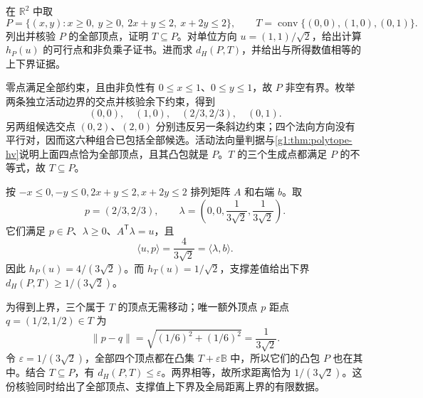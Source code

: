 \begin{exercise}\label{g1:ex:planar-polytope-distance-certificate}
	在 \(\mathbb R^2\) 中取
	\[
		P=\{(x,y):x\ge0,\ y\ge0,\ 2x+y\le2,\ x+2y\le2\},
		\qquad T=\operatorname{conv}\{(0,0),(1,0),(0,1)\}.
	\]
	列出并核验 \(P\) 的全部顶点，证明 \(T\subseteq P\)。对单位方向 \(u=(1,1)/\sqrt2\)，给出计算 \(h_P(u)\) 的可行点和非负乘子证书。进而求 \(d_H(P,T)\)，并给出与所得数值相等的上下界证据。
\end{exercise}
\begin{solution}
	零点满足全部约束，且由非负性有 \(0\le x\le1\)、\(0\le y\le1\)，故 \(P\) 非空有界。枚举两条独立活动边界的交点并核验余下约束，得到
	\[
		(0,0),\quad (1,0),\quad (2/3,2/3),\quad (0,1).
	\]
	另两组候选交点 \((0,2)\)、\((2,0)\) 分别违反另一条斜边约束；四个法向方向没有平行对，因而这六种组合已包括全部候选。活动法向量判据与\cref{g1:thm:polytope-hv}说明上面四点恰为全部顶点，且其凸包就是 \(P\)。\(T\) 的三个生成点都满足 \(P\) 的不等式，故 \(T\subseteq P\)。

	按 \(-x\le0,-y\le0,2x+y\le2,x+2y\le2\) 排列矩阵 \(A\) 和右端 \(b\)。取
	\[
		p=(2/3,2/3),\qquad
		\lambda=\left(0,0,\frac1{3\sqrt2},\frac1{3\sqrt2}\right).
	\]
	它们满足 \(p\in P\)、\(\lambda\ge0\)、\(A^{\mathsf T}\lambda=u\)，且
	\[
		\langle u,p\rangle=\frac4{3\sqrt2}=\langle\lambda,b\rangle.
	\]
	因此 \(h_P(u)=4/(3\sqrt2)\)。而 \(h_T(u)=1/\sqrt2\)，支撑差值给出下界 \(d_H(P,T)\ge1/(3\sqrt2)\)。

	为得到上界，三个属于 \(T\) 的顶点无需移动；唯一额外顶点 \(p\) 距点 \(q=(1/2,1/2)\in T\) 为
	\[
		\lVert p-q\rVert=\sqrt{(1/6)^2+(1/6)^2}=\frac1{3\sqrt2}.
	\]
	令 \(\varepsilon=1/(3\sqrt2)\)，全部四个顶点都在凸集 \(T+\varepsilon\mathbb B\) 中，所以它们的凸包 \(P\) 也在其中。结合 \(T\subseteq P\)，有 \(d_H(P,T)\le\varepsilon\)。两界相等，故所求距离恰为 \(1/(3\sqrt2)\)。这份核验同时给出了全部顶点、支撑值上下界及全局距离上界的有限数据。
\end{solution}

